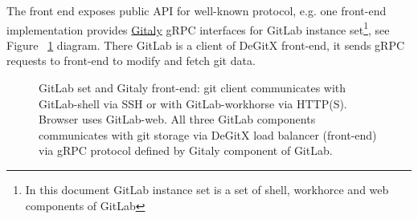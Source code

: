 \documentclass[acmlarge, screen, nonacm]{acmart}
\begin{document}
The front end exposes public API for well-known protocol, e.g. one front-end implementation provides
\href{https://docs.gitlab.com/ee/administration/gitaly/}{Gitaly} gRPC interfaces for GitLab
instance set\footnote{In this document GitLab instance set is a set of shell, workhorce and web components of GitLab},
see Figure ~\ref{fig:gitlab-set} diagram. There GitLab is a client of DeGitX front-end, it sends gRPC requests to
front-end to modify and fetch git data.

\begin{figure}
  \begin{center}
  \end{center}
  \caption{
    GitLab set and Gitaly front-end:
    git client communicates with GitLab-shell via SSH or with GitLab-workhorse via HTTP(S).
    Browser uses GitLab-web. All three GitLab components communicates with git storage via DeGitX load balancer
    (front-end) via gRPC protocol defined by Gitaly component of GitLab.
  }
  \label{fig:gitlab-set}
\end{figure}
\end{document}

